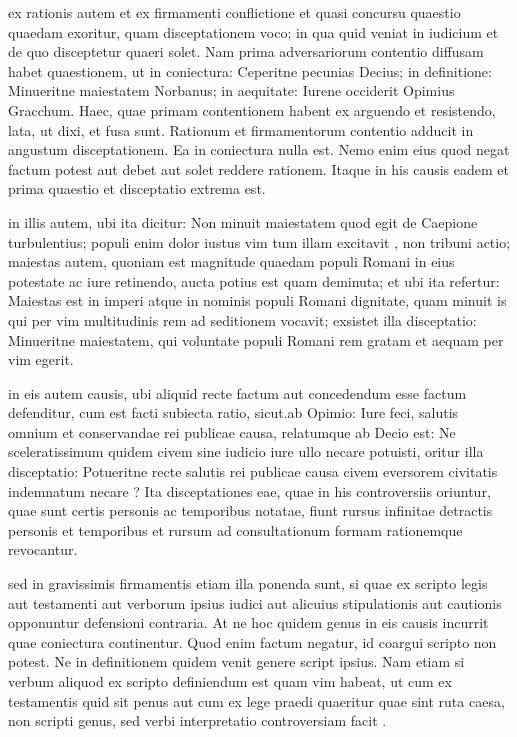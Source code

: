  ex rationis autem et ex firmamenti conflictione et quasi concursu quaestio quaedam exoritur, quam disceptationem voco; in qua quid veniat in iudicium et de quo disceptetur quaeri solet. Nam prima adversariorum contentio diffusam habet quaestionem, ut in coniectura: Ceperitne pecunias Decius; in definitione: Minueritne maiestatem Norbanus; in aequitate: Iurene occiderit Opimius Gracchum. Haec, quae primam contentionem habent ex arguendo et resistendo, lata, ut dixi, et fusa sunt. Rationum et firmamentorum contentio adducit in angustum disceptationem. Ea in coniectura nulla est. Nemo enim eius quod negat factum potest aut debet aut solet reddere rationem. Itaque in his causis eadem et prima quaestio et disceptatio extrema est.

 in illis autem, ubi ita dicitur: Non minuit maiestatem quod egit de Caepione turbulentius; populi enim dolor iustus vim tum illam excitavit , non tribuni actio; maiestas autem, quoniam est magnitude quaedam populi Romani in eius potestate ac iure retinendo, aucta potius est quam deminuta; et ubi ita refertur: Maiestas est in imperi atque in nominis populi Romani dignitate, quam minuit is qui per vim multitudinis rem ad seditionem vocavit; exsistet illa disceptatio: Minueritne maiestatem, qui voluntate populi Romani rem gratam et aequam per vim egerit.

 in eis autem causis, ubi aliquid recte factum aut concedendum esse factum defenditur, cum est facti subiecta ratio, sicut.ab Opimio: Iure feci, salutis omnium et conservandae rei publicae causa, relatumque ab Decio est: Ne sceleratissimum quidem civem sine iudicio iure ullo necare potuisti, oritur illa disceptatio: Potueritne recte salutis rei publicae causa civem eversorem civitatis indemnatum necare ? Ita disceptationes eae, quae in his controversiis oriuntur, quae sunt certis personis ac temporibus notatae, fiunt rursus infinitae detractis personis et temporibus et rursum ad consultationum formam rationemque revocantur.

 sed in gravissimis firmamentis etiam illa ponenda sunt, si quae ex scripto legis aut testamenti aut verborum ipsius iudici aut alicuius stipulationis aut cautionis opponuntur defensioni contraria. At ne hoc quidem genus in eis causis incurrit quae coniectura continentur. Quod enim factum negatur, id coargui scripto non potest. Ne in definitionem quidem venit genere script ipsius. Nam etiam si verbum aliquod ex scripto definiendum est quam vim habeat, ut cum ex testamentis quid sit penus aut cum ex lege praedi quaeritur quae sint ruta caesa, non scripti genus, sed verbi interpretatio controversiam facit .


